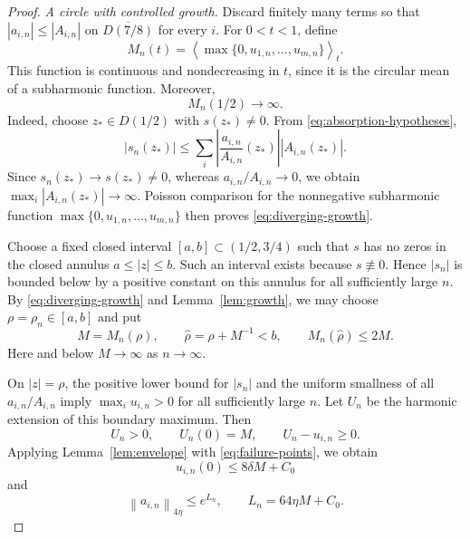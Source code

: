 \documentclass[12pt,letterpaper,reqno]{amsart}
\theoremstyle{definition}
\numberwithin{equation}{section}
\newcommand{\norm}[2]{\left\lVert #1\right\rVert_{#2}}
\newcommand{\mean}[2]{\left\langle #1\right\rangle_{#2}}
\begin{document}
\begin{proof}
		\smallskip\noindent\emph{A circle with controlled growth.}
		Discard finitely many terms so that
		$|a_{i,n}|\le|A_{i,n}|$ on $\overline{D(7/8)}$ for every $i$. For
		$0<t<1$, define
		\begin{equation*}
			M_n(t)=\mean{\max\{0,u_{1,n},\ldots,u_{m,n}\}}{t}.
		\end{equation*}
		This function is continuous and nondecreasing in $t$, since it is the
		circular mean of a subharmonic function. Moreover,
		\begin{equation}\label{eq:diverging-growth}
			M_n(1/2)\longrightarrow\infty.
		\end{equation}
		Indeed, choose $z_*\in D(1/2)$ with $s(z_*)\ne0$. From
		\eqref{eq:absorption-hypotheses},
		\begin{equation*}
			|s_n(z_*)|
			\le\sum_i\left|\frac{a_{i,n}}{A_{i,n}}(z_*)\right|
			|A_{i,n}(z_*)|.
		\end{equation*}
		Since $s_n(z_*)\to s(z_*)\ne0$, whereas
		$a_{i,n}/A_{i,n}\to0$, we obtain
		$\max_i|A_{i,n}(z_*)|\to\infty$. Poisson comparison for the
		nonnegative subharmonic function
		$\max\{0,u_{1,n},\ldots,u_{m,n}\}$ then proves
		\eqref{eq:diverging-growth}.
		
		Choose a fixed closed interval $[a,b]\subset(1/2,3/4)$ such that $s$
		has no zeros in the closed annulus $a\le|z|\le b$. Such an interval
		exists because $s\not\equiv0$. Hence $|s_n|$ is bounded below by a
		positive constant on this annulus for all sufficiently large $n$. By
		\eqref{eq:diverging-growth} and Lemma~\ref{lem:growth}, we may choose
		$\rho=\rho_n\in[a,b]$ and put
		\begin{equation}\label{eq:chosen-radii}
			M=M_n(\rho),\qquad
			\widehat\rho=\rho+M^{-1}<b,\qquad
			M_n(\widehat\rho)\le2M.
		\end{equation}
		Here and below $M\to\infty$ as $n\to\infty$.
		
		On $|z|=\rho$, the positive lower bound for $|s_n|$ and the uniform
		smallness of all $a_{i,n}/A_{i,n}$ imply
		$\max_i u_{i,n}>0$ for all sufficiently large $n$. Let $U_n$ be the
		harmonic extension of this boundary maximum. Then
		\begin{equation*}
			U_n>0,\qquad U_n(0)=M,\qquad U_n-u_{i,n}\ge0.
		\end{equation*}
		Applying Lemma~\ref{lem:envelope} with
		\eqref{eq:failure-points}, we obtain
		\begin{equation}\label{eq:small-central-values}
			u_{i,n}(0)\le8\delta M+C_0
		\end{equation}
		and
		\begin{equation}\label{eq:small-disk-growth}
			\norm{a_{i,n}}{4\eta}\le e^{L_n},
			\qquad L_n=64\eta M+C_0.
		\end{equation}
		

\end{proof}
\end{document}
